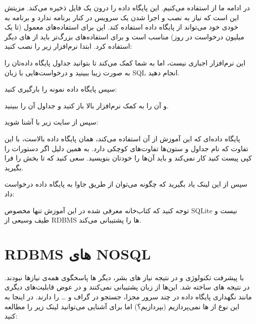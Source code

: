 \documentclass[]{article}
\begin{document}
در ادامه ما از  استفاده می‌کنیم. این  پایگاه داده را درون یک فایل ذخیره می‌کند. مزیتش این است که نیاز به نصب و اجرا شدن یک سرویس در کنار برنامه ندارد و برنامه به خودی خود می‌تواند از پایگاه داده استفاده کند. این  برای استفاده‌های معمول (تا یک میلیون درخواست در روز) مناسب است و برای استفاده‌های بزرگ‌تر باید از  های دیگر استفاده کرد.
\newpage
ابتدا نرم‌افزار زیر را نصب کنید:

\href{https://sqlitebrowser.org/dl/}{\textcolor{blue}{\underline{}}}	 	 	 	


این نرم‌افزار اجباری نیست، اما به شما کمک می‌کند تا بتوانید جداول پایگاه داده‌تان را به صورت زیبا ببینید و درخواست‌هایی با زبان SQL انجام دهید.

سپس پایگاه داده نمونه  را بارگیری کنید:

\href{https://github.com/jpwhite3/northwind-SQLite3/blob/master/Northwind_small.sqlite}{\textcolor{blue}{\underline{}}}

و آن را به کمک نرم‌افزار بالا باز کنید و جداول آن را ببینید.

سپس از سایت زیر با  آشنا شوید:

\href{https://www.w3schools.com/sql/sql_select.asp}{\textcolor{blue}{\underline{}}}

پایگاه داده‌ای که این آموزش از آن استفاده می‌کند، همان پایگاه داده بالاست، با این تفاوت که نام جداول و ستون‌ها تفاوت‌های کوچکی دارد. به همین دلیل اگر دستورات را کپی پیست کنید کار نمی‌کند و باید آن‌ها را خودتان بنویسید. سعی کنید که تا بخش  را فرا بگیرید.

سپس از این لینک یاد بگیرید که چگونه می‌توان از طریق جاوا به پایگاه داده درخواست داد:

\href{https://en.wikipedia.org/wiki/Apache_Maven}{\textcolor{blue}{\underline{}}}

توجه کنید که کتاب‌خانه معرفی شده در این آموزش تنها مخصوص SQLite نیست و طیف وسیعی از RDBMS ها را پشتیبانی می‌کند.




\section*{{\titr RDBMS های NOSQL}}

با پیشرفت تکنولوژی و در نتیجه نیاز های بشر، دیگر  ها پاسخگوی همه‌ی نیازها نبودند. در نتیجه  های  ساخته شد. این‌ها از زبان  پشتیبانی نمی‌کنند و در عوض قابلیت‌های دیگری مانند نگهداری پایگاه داده در چند سرور مجزا، جستجو در گراف و … را دارند. در اینجا به این نوع از  ها نمی‌پردازیم (بپردازیم؟) اما برای آشنایی می‌توانید لینک زیر را مطالعه کنید:

\href{https://www.mongodb.com/nosql-explained}{\textcolor{blue}{\underline{}}}
\end{document}
